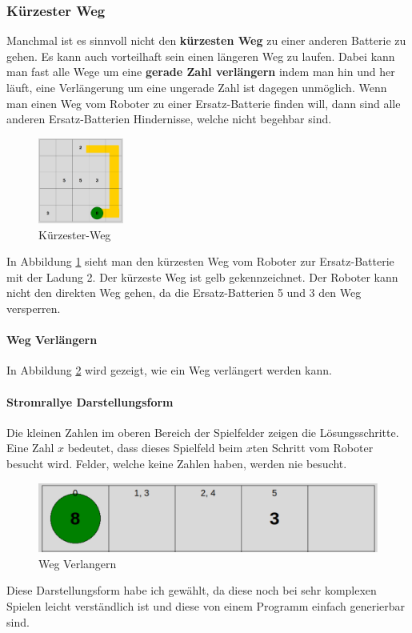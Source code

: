 \documentclass[a4paper,12pt,arial]{scrartcl}
\begin{document}
\subsubsection{Kürzester Weg}
Manchmal ist es sinnvoll nicht den \textbf{kürzesten Weg} zu einer anderen Batterie zu gehen.
Es kann auch vorteilhaft sein einen längeren Weg zu laufen. Dabei kann man fast alle Wege um eine \textbf{gerade Zahl verlängern} indem man hin und her läuft, eine Verlängerung um eine ungerade Zahl ist dagegen unmöglich.
Wenn man einen Weg vom Roboter zu einer Ersatz-Batterie finden will, dann sind alle anderen Ersatz-Batterien Hindernisse, welche nicht begehbar sind.
\captionsetup[figure]{name=Abb.}
\begin{figure}
\vspace{-10pt}
    \includegraphics[width=0.25\textwidth]{shortest_w.pdf}
    \vspace{-25pt}
    \caption{Kürzester-Weg}
    \label{fig:weg}
\vspace{-30pt}
\end{figure}
\captionsetup[figure]{name=Abbildung}
In Abbildung \ref{fig:weg}  sieht man den kürzesten Weg vom Roboter zur Ersatz-Batterie mit der Ladung 2. Der kürzeste Weg ist gelb gekennzeichnet. Der Roboter kann nicht den direkten Weg gehen, da die Ersatz-Batterien 5 und 3 den Weg versperren.

\paragraph{Weg Verlängern}


In Abbildung \ref{fig:weg_verlangern} wird gezeigt, wie ein Weg verlängert werden kann.
\paragraph{Stromrallye Darstellungsform}
Die kleinen Zahlen im oberen Bereich der Spielfelder zeigen die Lösungsschritte.
Eine Zahl $x$ bedeutet, dass dieses Spielfeld beim $x$ten Schritt vom Roboter besucht wird.
Felder, welche keine Zahlen haben, werden nie besucht.
\\
\begin{figure}[h]
    \centering
    \includegraphics[height=0.09\textheight]{weg_verlaengern_n.pdf}
    \caption{Weg Verlangern}
    \label{fig:weg_verlangern}
\end{figure}
Diese Darstellungsform habe ich gewählt, da diese noch bei sehr komplexen Spielen leicht verständlich ist und diese von einem Programm einfach generierbar sind.
\end{document}
